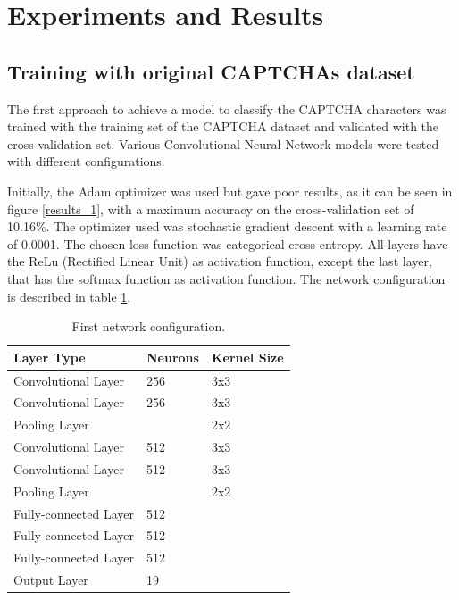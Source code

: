 \documentclass[journal]{IEEEtran}
\begin{document}
\section{Experiments and Results}

\subsection{Training with original CAPTCHAs dataset}

The first approach to achieve a model to classify the CAPTCHA characters was trained with the training set of the CAPTCHA dataset and validated with the cross-validation set. Various Convolutional Neural Network models were tested with different configurations. 

Initially, the Adam optimizer was used but gave poor results, as it can be seen in figure \ref{results_1}, with a maximum accuracy on the cross-validation set of 10.16\%. The optimizer used was stochastic gradient descent with a learning rate of 0.0001. The chosen loss function was categorical cross-entropy. All layers have the ReLu (Rectified Linear Unit) as activation function, except the last layer, that has the softmax function as activation function. The network configuration is described in table \ref{table:network_configuration_first}.

\begin{table}[]
\centering
\caption{First network configuration.}
\label{table:network_configuration_first}
\begin{tabular}{|l|l|l|}
\hline
\textbf{Layer Type}   & \textbf{Neurons} & \textbf{Kernel Size} \\ \hline
Convolutional Layer   & 256              & 3x3                  \\ \hline
Convolutional Layer   & 256              & 3x3                  \\ \hline
Pooling Layer         &                  & 2x2                  \\ \hline
Convolutional Layer   & 512              & 3x3                  \\ \hline
Convolutional Layer   & 512              & 3x3                  \\ \hline
Pooling Layer         &                  & 2x2                  \\ \hline
Fully-connected Layer & 512              &                      \\ \hline
Fully-connected Layer & 512              &                      \\ \hline
Fully-connected Layer & 512              &                      \\ \hline
Output Layer          & 19               &                      \\ \hline
\end{tabular}
\end{table}
\end{document}
